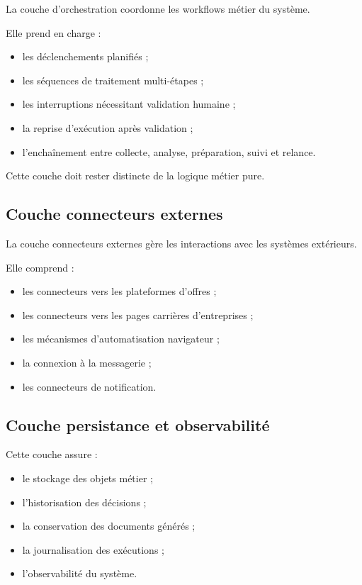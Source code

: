 \documentclass[11pt,a4paper]{article}
\begin{document}
La couche d’orchestration coordonne les workflows métier du système.

Elle prend en charge :

\begin{itemize}
    \item les déclenchements planifiés ;
    \item les séquences de traitement multi-étapes ;
    \item les interruptions nécessitant validation humaine ;
    \item la reprise d’exécution après validation ;
    \item l’enchaînement entre collecte, analyse, préparation, suivi et relance.
\end{itemize}

Cette couche doit rester distincte de la logique métier pure.

\subsection{Couche connecteurs externes}

La couche connecteurs externes gère les interactions avec les systèmes extérieurs.

Elle comprend :

\begin{itemize}
    \item les connecteurs vers les plateformes d’offres ;
    \item les connecteurs vers les pages carrières d’entreprises ;
    \item les mécanismes d’automatisation navigateur ;
    \item la connexion à la messagerie ;
    \item les connecteurs de notification.
\end{itemize}

\subsection{Couche persistance et observabilité}

Cette couche assure :

\begin{itemize}
    \item le stockage des objets métier ;
    \item l’historisation des décisions ;
    \item la conservation des documents générés ;
    \item la journalisation des exécutions ;
    \item l’observabilité du système.
\end{itemize}
\end{document}
